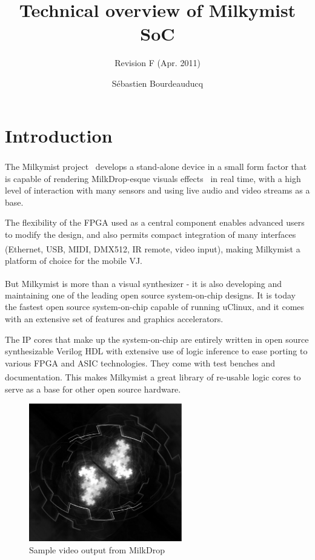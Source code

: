 \documentclass[a4paper,11pt,twocolumn]{paper}
\title{Technical overview of Milkymist SoC}
\subtitle{Revision F (Apr. 2011)}
\author{S\'ebastien Bourdeauducq}
\begin{document}
\maketitle{}
\section{Introduction}
The Milkymist\textsuperscript{\texttrademark} project~\cite{milkymist} develops a stand-alone device in a small form factor that is capable of rendering MilkDrop-esque visuals effects~\cite{milkdrop} in real time, with a high level of interaction with many sensors and using live audio and video streams as a base.

The flexibility of the FPGA used as a central component enables advanced users to modify the design, and also permits compact integration of many interfaces (Ethernet, USB, MIDI, DMX512, IR remote, video input), making Milkymist\textsuperscript{\texttrademark} a platform of choice for the mobile VJ.

But Milkymist\textsuperscript{\texttrademark} is more than a visual synthesizer - it is also developing and maintaining one of the leading open source system-on-chip designs. It is today the fastest open source system-on-chip capable of running uClinux, and it comes with an extensive set of features and graphics accelerators.

The IP cores that make up the system-on-chip are entirely written in open source synthesizable Verilog HDL with extensive use of logic inference to ease porting to various FPGA and ASIC technologies. They come with test benches and documentation. This makes Milkymist\textsuperscript{\texttrademark} a great library of re-usable logic cores to serve as a base for other open source hardware.

\begin{figure}
\centering
\includegraphics[height=60mm]{milkdrop_bw.eps}
\caption{Sample video output from MilkDrop}
\label{fig:genodefx}
\end{figure}
\end{document}
